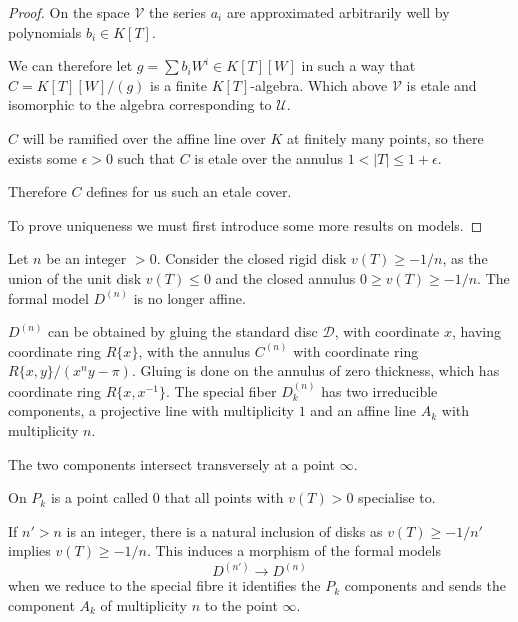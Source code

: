\documentclass[oneside,12pt,]{article}
\newcommand{\inv}{^{-1}}
\newcommand{\lb}{[}
\newcommand{\rb}{]}
\newcommand{\lt}{<}
\newcommand{\gt}{>}
\begin{document}
\begin{proof}
    On the space $\mathscr V$ the series $a_i$ are approximated arbitrarily well by polynomials $b_i\in K\lb T\rb $.

    We can therefore let $g = \sum b_i W^i \in K\lb T\rb \lb W\rb $ in such a way that $C = K\lb T\rb \lb W\rb /(g)$ is a finite $K\lb T\rb $-algebra.
    Which above $\mathscr V$ is etale and isomorphic to the algebra corresponding to $\mathscr U$.

    $C$ will be ramified over the affine line over $K$ at finitely many points, so there exists some $\epsilon  \gt  0$ such that $C$ is etale over the annulus $1 \lt |T| \le 1 + \epsilon $.

    Therefore $C$ defines for us such an etale cover.

    To prove uniqueness we must first introduce some more results on models.
\end{proof}

Let $n$ be an integer $> 0$. Consider the closed rigid disk $v(T) \ge -1/n$, as the union of the unit disk $v (T) \le  0$ and the closed annulus $0 \ge v (T) \ge-1/n$. The formal model $D^{(n)}$ is no longer affine.

$D^{(n)}$ can be obtained by gluing the standard disc $\mathscr D$, with coordinate $x$, having coordinate  ring $R \{x\}$, with the annulus $C^{(n)}$ with coordinate ring $R \{x, y\} / (x^n y - \pi)$. Gluing is done on the annulus of zero thickness, which has coordinate ring $R \{x, x \inv\}$. The special fiber $D_k^{(n)}$ has two irreducible components, a projective line with multiplicity $1$ and an affine line $A_k$ with multiplicity $n$.

The two components intersect transversely at a point $\infty $.

On $P_k$ is a point called $0$ that all points with $v(T) \gt 0$ specialise to.

If $n' \gt n$ is an integer, there is a natural inclusion of disks as $v(T) \ge -1/n'$ implies $v(T) \ge -1/n$.
This induces a morphism of the formal models
\[
    D^{(n')} \to D^{(n)}
\]
when we reduce to the special fibre it identifies the $P_k$ components and sends the component $A_k$ of multiplicity $n$ to the point $\infty $.
\end{document}
